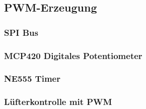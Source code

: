 \subsection{PWM-Erzeugung}
\subsubsection{SPI Bus}
\subsubsection{MCP420 Digitales Potentiometer}
\subsubsection{NE555 Timer}
\subsubsection{Lüfterkontrolle mit PWM}
